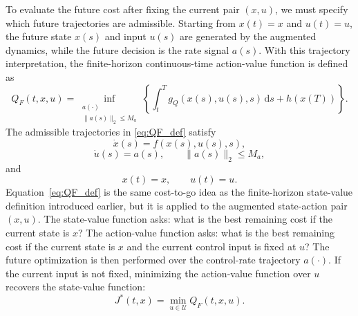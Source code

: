 \documentclass[11pt]{article}
\begin{document}
To evaluate the future cost after fixing the current pair $(x,u)$, we must specify which future trajectories are admissible. Starting from $x(t)=x$ and $u(t)=u$, the future state $x(s)$ and input $u(s)$ are generated by the augmented dynamics, while the future decision is the rate signal $a(s)$. With this trajectory interpretation, the finite-horizon continuous-time action-value function is defined as
\begin{equation}
Q_F(t,x,u)
=
\inf_{\substack{a(\cdot)\\ \|a(s)\|_2\leq M_a}}
\left\{
\int_t^T g_Q(x(s),u(s),s)\,\mathrm{d}s
+h(x(T))
\right\}.
\label{eq:QF_def}
\end{equation}
The admissible trajectories in \eqref{eq:QF_def} satisfy
\begin{equation}
\dot{x}(s)=f(x(s),u(s),s),
\label{eq:QF_x_dyn}
\end{equation}
\begin{equation}
\dot{u}(s)=a(s),
\qquad \|a(s)\|_2\leq M_a,
\label{eq:QF_u_dyn}
\end{equation}
and
\begin{equation}
x(t)=x,
\qquad u(t)=u.
\label{eq:QF_initial}
\end{equation}
Equation~\eqref{eq:QF_def} is the same cost-to-go idea as the finite-horizon state-value definition introduced earlier, but it is applied to the augmented state-action pair $(x,u)$. The state-value function asks: what is the best remaining cost if the current state is $x$? The action-value function asks: what is the best remaining cost if the current state is $x$ and the current control input is fixed at $u$? The future optimization is then performed over the control-rate trajectory $a(\cdot)$. If the current input is not fixed, minimizing the action-value function over $u$ recovers the state-value function:
\begin{equation}
J^{*}(t,x)=\min_{u\in\mathcal{U}}Q_F(t,x,u).
\label{eq:value_from_QF}
\end{equation}
\end{document}
